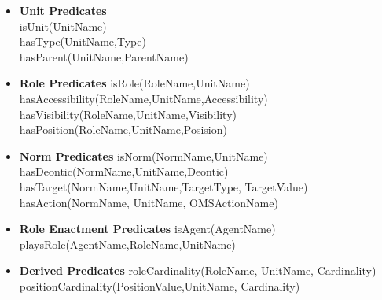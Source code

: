\begin{itemize}


\item \textbf{Unit Predicates}\\
isUnit(UnitName)\\
hasType(UnitName,Type)\\
hasParent(UnitName,ParentName)\\

\item \textbf{Role Predicates}
isRole(RoleName,UnitName)\\
hasAccessibility(RoleName,UnitName,Accessibility)\\
hasVisibility(RoleName,UnitName,Visibility)\\
hasPosition(RoleName,UnitName,Posision)

\item\textbf{Norm Predicates}
isNorm(NormName,UnitName)\\
hasDeontic(NormName,UnitName,Deontic)\\
hasTarget(NormName,UnitName,TargetType, TargetValue)\\
hasAction(NormName, UnitName, OMSActionName)

\item\textbf{ Role Enactment Predicates}
isAgent(AgentName)\\
playsRole(AgentName,RoleName,UnitName)\\

\item\textbf{Derived Predicates}
roleCardinality(RoleName, UnitName, Cardinality)\\
positionCardinality(PositionValue,UnitName, Cardinality)\\


\end{itemize}
